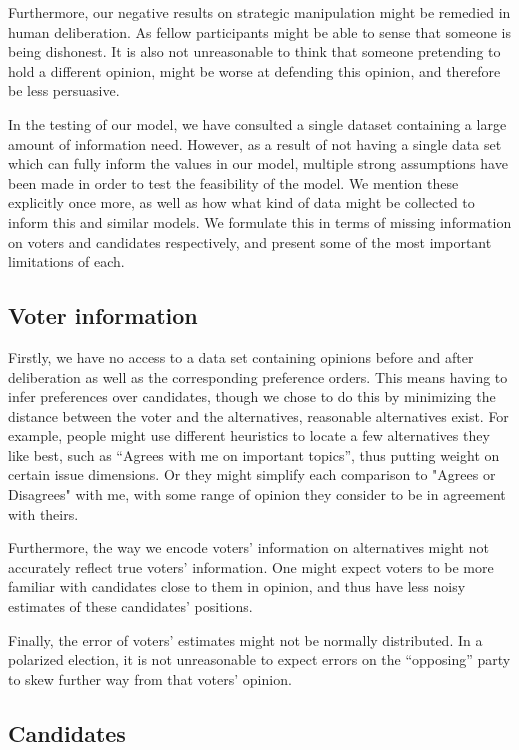 Furthermore, our negative results on strategic manipulation might be remedied
in human deliberation. As fellow participants might be able to sense that
someone is being dishonest. It is also not unreasonable to think that someone
pretending to hold a different opinion, might be worse at defending this
opinion, and therefore be less persuasive.

In the testing of our model, we have consulted a single dataset containing a
large amount of information need. 
However, as a result of not having a single
data set which can fully inform the values in our model, multiple strong
assumptions have been made in order to test the feasibility of the model. We
mention these explicitly once more, as well as how what kind of data might be
collected to inform this and similar models. We formulate this in terms of
missing information on voters and candidates respectively, and present some of
the most important limitations of each.


\subsection{Voter information}

Firstly, we have no access to a data set containing opinions before and after
deliberation as well as the corresponding preference orders. This means having to infer
preferences over candidates, though we chose to do this by minimizing the
distance between the voter and the alternatives, reasonable alternatives exist.
For example, people might use different heuristics to locate a few alternatives
they like best, such as ``Agrees with me on important topics'', thus putting weight on certain issue dimensions. Or they might
simplify each comparison to "Agrees or Disagrees" with me, with some range of
opinion they consider to be in agreement with theirs. 

Furthermore, the way we encode voters' information on alternatives might not
accurately reflect true voters' information. One might expect voters to be more
familiar with candidates close to them in opinion, and thus have less noisy
estimates of these candidates' positions. 

Finally,  the error of voters' estimates might not be normally distributed. In
a polarized election, it is not unreasonable to expect errors on the
``opposing'' party to skew further way from that voters' opinion.


\subsection{Candidates}

